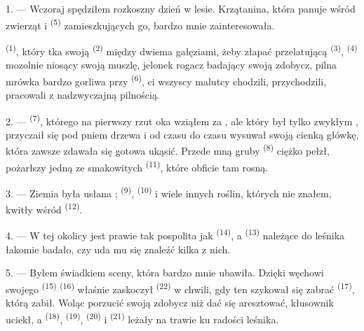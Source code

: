 \VUsaut{3.0mm}

1. --- Wczoraj spędziłem rozkoszny dzień w lesie. Krzątanina, która panuje wśród
zwierząt i  \textsuperscript{(5)} zamieszkujących go, bardzo mnie
zainteresowała.

 \textsuperscript{(1)}, który tka swoją  \textsuperscript{(2)}
między dwiema gałęziami, żeby złapać przelatującą  \textsuperscript{(3)},
 \textsuperscript{(4)} mozolnie niosący swoją muszlę, jelonek rogacz
badający swoją zdobycz, pilna mrówka bardzo gorliwa przy 
\textsuperscript{(6)}, ci wszyscy malutcy chodzili, przychodzili, pracowali z
nadzwyczajną pilnością.

2. ---  \textsuperscript{(7)}, którego na pierwszy rzut oka wziąłem za
, ale który był tylko zwykłym , przyczaił się pod pniem
drzewa i od czasu do czasu wysuwał swoją cienką główkę, która zawsze zdawała się gotowa
ukąsić. Przede mną gruby  \textsuperscript{(8)} ciężko pełzł, pożarłszy
jedną ze smakowitych  \textsuperscript{(11)}, które obficie tam rosną.

3. --- Ziemia była usłana ; 
\textsuperscript{(9)},  \textsuperscript{(10)} i wiele innych roślin,
których nie znałem, kwitły wśród  \textsuperscript{(12)}.

4. --- W tej okolicy  jest prawie tak pospolita jak 
\textsuperscript{(14)}, a  \textsuperscript{(13)} należące do leśnika
łakomie badało, czy uda mu się znaleźć kilka z nich.

\VUsaut{3.0mm}
\VUsaut{3.0mm}

5. --- Byłem świadkiem  sceny, która bardzo mnie ubawiła. Dzięki węchowi
swojego  \textsuperscript{(15)}  \textsuperscript{(16)}
właśnie zaskoczył  \textsuperscript{(22)} w chwili, gdy ten szykował
się zabrać  \textsuperscript{(17)}, którą zabił. Woląc porzucić swoją
zdobycz niż dać się aresztować, kłusownik uciekł, a  \textsuperscript{(18)},
 \textsuperscript{(19)},  \textsuperscript{(20)} i
 \textsuperscript{(21)} leżały na trawie ku radości leśnika.

